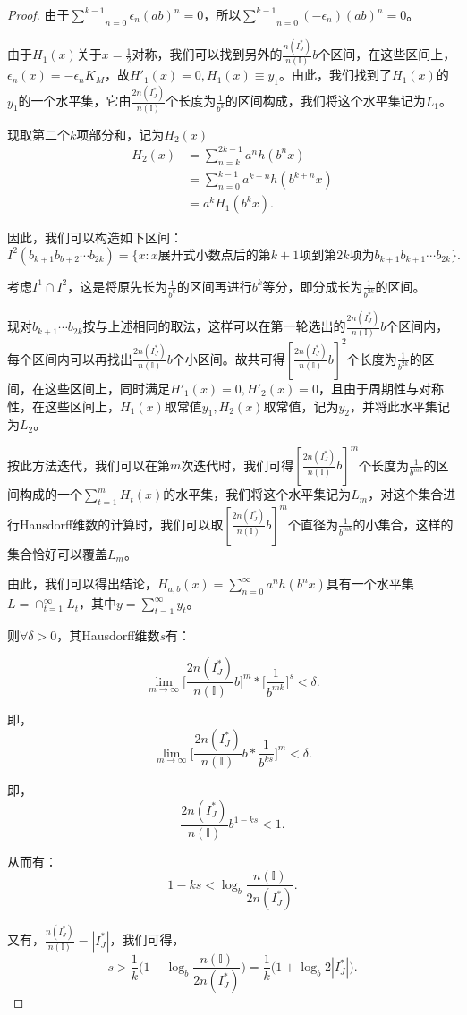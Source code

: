 \begin{proof}
由于$\underset{n=0}{\overset{k-1}{\sum}}\epsilon_n(ab)^n=0$，所以$\underset{n=0}{\overset{k-1}{\sum}}(-\epsilon_n)(ab)^n=0$。

由于$H_1(x)$关于$x=\frac{1}{2}$对称，我们可以找到另外的$\frac{n(I_J^*)}{n(\mathbb{I})}b$个区间，在这些区间上，$\epsilon_n(x)=-\epsilon_nK_M$，故$H'_1(x)=0,H_1(x)\equiv y_1$。由此，我们找到了$H_1(x)$的$y_1$的一个水平集，它由$\frac{2n(I_J^*)}{n(\mathbb{I})}$个长度为$\frac{1}{b^k}$的区间构成，我们将这个水平集记为$L_1$。

现取第二个$k$项部分和，记为$H_2(x)$
$$
      \begin{aligned}
            H_2(x)&= \sum_{n=k}^{2k-1}a^nh(b^nx)\\
                  &= \sum_{n=0}^{k-1}a^{k+n}h(b^{k+n}x)\\
                  &= a^kH_1(b^kx).
      \end{aligned}
$$

因此，我们可以构造如下区间：
$$
      I^2(b_{k+1}b_{b+2}\cdots b_{2k})=\{x:x\mbox{展开式小数点后的第}k+1\mbox{项到第}2k\mbox{项为}b_{k+1}b_{k+1}\cdots b_{2k}\}.
$$

考虑$I^1\cap I^2$，这是将原先长为$\frac{1}{b^k}$的区间再进行$b^k$等分，即分成长为$\frac{1}{b^{2k}}$的区间。

现对$b_{k+1}\cdots b_{2k}$按与上述相同的取法，这样可以在第一轮选出的$\frac{2n(I_J^*)}{n(\mathbb{I})}b$个区间内，每个区间内可以再找出$\frac{2n(I_J^*)}{n(\mathbb{I})}b$个小区间。故共可得$[\frac{2n(I_J^*)}{n(\mathbb{I})}b]^2$个长度为$\frac{1}{b^{2k}}$的区间，在这些区间上，同时满足$H'_1(x)=0,H'_2(x)=0$，且由于周期性与对称性，在这些区间上，$H_1(x)$取常值$y_1,H_2(x)$取常值，记为$y_2$，并将此水平集记为$L_2$。

按此方法迭代，我们可以在第$m$次迭代时，我们可得$[\frac{2n(I_J^*)}{n(\mathbb{I})}b]^m$个长度为$\frac{1}{b^{mk}}$的区间构成的一个$\sum_{t=1}^mH_t(x)$的水平集，我们将这个水平集记为$L_m$，对这个集合进行Hausdorff维数的计算时，我们可以取$[\frac{2n(I_J^*)}{n(\mathbb{I})}b]^m$个直径为$\frac{1}{b^{mk}}$的小集合，这样的集合恰好可以覆盖$L_m$。

由此，我们可以得出结论，$H_{a,b}(x)=\sum_{n=0}^\infty a^nh(b^nx)$具有一个水平集$L=\cap_{t=1}^\infty L_t$，其中$y=\sum_{t=1}^\infty y_t$。

则$\forall \delta>0$，其Hausdorff维数$s$有：

$$
      \lim_{m\rightarrow\infty}\Big[\frac{2n(I_J^*)}{n(\mathbb{I})}b\Big]^m*\Big[\frac{1}{b^{mk}}\Big]^s<\delta.
$$

即，
$$
      \lim_{m\rightarrow\infty}\Big[\frac{2n(I_J^*)}{n(\mathbb{I})}b*\frac{1}{b^{ks}}\Big]^m<\delta.
$$

即，
$$
      \frac{2n(I_J^*)}{n(\mathbb{I})}b^{1-ks}<1.
$$

从而有：
$$
      1-ks<\log_b\frac{n(\mathbb{I})}{2n(I_J^*)}.
$$

又有，$\frac{n(I_J^*)}{n(\mathbb{I})}=|I_J^*|$，我们可得，
$$
      s>\frac{1}{k}\Big(1-\log_b\frac{n(\mathbb{I})}{2n(I_J^*)}\Big)=\frac{1}{k}\Big(1+\log_b2|I_J^*|\Big).
$$

\end{proof}

